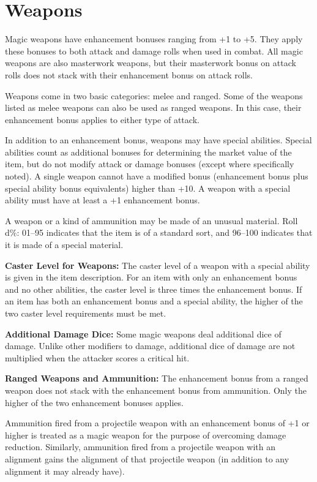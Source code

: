 \section{Weapons}
Magic weapons have enhancement bonuses ranging from +1 to +5. They apply these bonuses to both attack and damage rolls when used in combat. All magic weapons are also masterwork weapons, but their masterwork bonus on attack rolls does not stack with their enhancement bonus on attack rolls.

Weapons come in two basic categories: melee and ranged. Some of the weapons listed as melee weapons can also be used as ranged weapons. In this case, their enhancement bonus applies to either type of attack.

In addition to an enhancement bonus, weapons may have special abilities. Special abilities count as additional bonuses for determining the market value of the item, but do not modify attack or damage bonuses (except where specifically noted). A single weapon cannot have a modified bonus (enhancement bonus plus special ability bonus equivalents) higher than +10. A weapon with a special ability must have at least a +1 enhancement bonus.

A weapon or a kind of ammunition may be made of an unusual material. Roll d\%: 01--95 indicates that the item is of a standard sort, and 96--100 indicates that it is made of a special material.

\textbf{Caster Level for Weapons:} The caster level of a weapon with a special ability is given in the item description. For an item with only an enhancement bonus and no other abilities, the caster level is three times the enhancement bonus. If an item has both an enhancement bonus and a special ability, the higher of the two caster level requirements must be met.

\textbf{Additional Damage Dice:} Some magic weapons deal additional dice of damage. Unlike other modifiers to damage, additional dice of damage are not multiplied when the attacker scores a critical hit.

\textbf{Ranged Weapons and Ammunition:} The enhancement bonus from a ranged weapon does not stack with the enhancement bonus from ammunition. Only the higher of the two enhancement bonuses applies.

Ammunition fired from a projectile weapon with an enhancement bonus of +1 or higher is treated as a magic weapon for the purpose of overcoming damage reduction. Similarly, ammunition fired from a projectile weapon with an alignment gains the alignment of that projectile weapon (in addition to any alignment it may already have).

